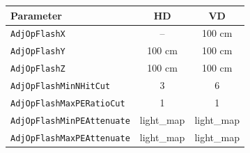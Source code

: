 \begin{tabular}{lcc}
    \toprule
    \textbf{Parameter} & \textbf{HD} & \textbf{VD} \\
    \midrule
    \texttt{AdjOpFlashX} & -- & 100 \si{\centi\meter} \\
    \texttt{AdjOpFlashY} & 100 \si{\centi\meter} & 100 \si{\centi\meter} \\
    \texttt{AdjOpFlashZ} & 100 \si{\centi\meter} & 100 \si{\centi\meter} \\
    \texttt{AdjOpFlashMinNHitCut} & 3 & 6 \\
    \texttt{AdjOpFlashMaxPERatioCut} & 1 & 1 \\
    \texttt{AdjOpFlashMinPEAttenuate} & light\_map & light\_map \\
    \texttt{AdjOpFlashMaxPEAttenuate} & light\_map & light\_map \\
    \bottomrule
\end{tabular}
